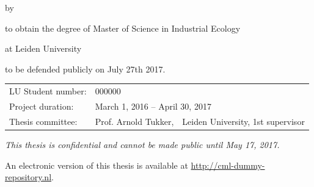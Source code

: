 \begin{titlepage}


\begin{center}

{\makeatletter
\largetitlestyle\fontsize{64}{94}\selectfont\@title
\makeatother}

{\makeatletter
\ifx\@subtitle\undefined\else
    \bigskip
   {\sffamily\fontsize{22}{32}\selectfont\@subtitle}    
\fi
\makeatother}

\bigskip
\bigskip

by

\bigskip
\bigskip

{\makeatletter
\largetitlestyle\fontsize{26}{26}\selectfont\@author
\makeatother}

\bigskip
\bigskip

to obtain the degree of Master of Science in Industrial Ecology

at Leiden University

to be defended publicly on July 27th 2017.

\vfill

\begin{tabular}{lll}
    LU Student number: & 000000 \\
    Project duration: & \multicolumn{2}{l}{March 1, 2016 -- April 30, 2017} \\
    Thesis committee: & Prof. Arnold Tukker, & Leiden University, 1st supervisor 
\end{tabular}

\bigskip
\bigskip
\emph{This thesis is confidential and cannot be made public until May 17, 2017.}

\bigskip
\bigskip
An electronic version of this thesis is available at \url{http://cml-dummy-repository.nl}.



\end{center}


\end{titlepage}

